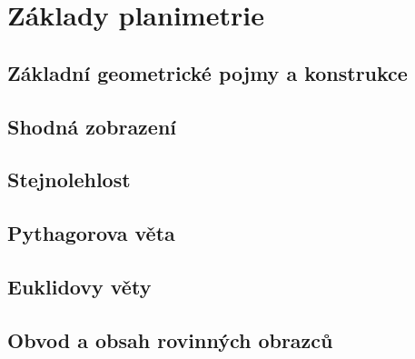 
\newpage
    \section{Základy planimetrie}

        \subsection{Základní geometrické pojmy a konstrukce}
        \subsection{Shodná zobrazení}
        \subsection{Stejnolehlost}
        \subsection{Pythagorova věta}
        \subsection{Euklidovy věty}
        \subsection{Obvod a obsah rovinných obrazců}